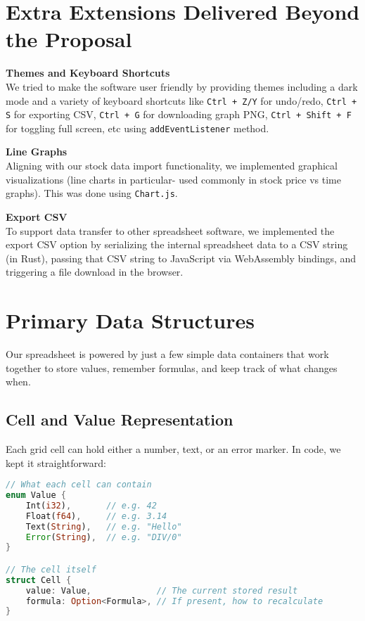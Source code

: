 \documentclass[12pt]{article}
\begin{document}
    \section{Extra Extensions Delivered Beyond the Proposal}
    \begin{description}
        \item\textbf{Themes and Keyboard Shortcuts}\\
        We tried to make the software user friendly by providing themes including a dark mode and a variety of keyboard shortcuts like \texttt{Ctrl + Z/Y} for undo/redo, \texttt{Ctrl + S} for exporting CSV, \texttt{Ctrl + G} for downloading graph PNG, \texttt{Ctrl + Shift + F} for toggling full screen, etc using \texttt{addEventListener} method.
        \item\textbf{Line Graphs} \\
        Aligning with our stock data import functionality, we implemented graphical visualizations (line charts in particular- used commonly in stock price vs time graphs). This was done using \texttt{Chart.js}.
        \item\textbf{Export CSV} \\
        To support data transfer to other spreadsheet software, we implemented the export CSV option by serializing the internal spreadsheet data to a CSV string (in Rust), passing that CSV string to JavaScript via WebAssembly bindings, and triggering a file download in the browser.
    \end{description}

    \section{Primary Data Structures}

    Our spreadsheet is powered by just a few simple data containers that work together to store values, remember formulas, and keep track of what changes when.

    \subsection{Cell and Value Representation}

    Each grid cell can hold either a number, text, or an error marker.  In code, we kept it straightforward:

    \begin{lstlisting}[language=Rust]
// What each cell can contain
enum Value {
    Int(i32),       // e.g. 42
    Float(f64),     // e.g. 3.14
    Text(String),   // e.g. "Hello"
    Error(String),  // e.g. "DIV/0"
}

// The cell itself
struct Cell {
    value: Value,             // The current stored result
    formula: Option<Formula>, // If present, how to recalculate
}
    \end{lstlisting}
\end{document}
